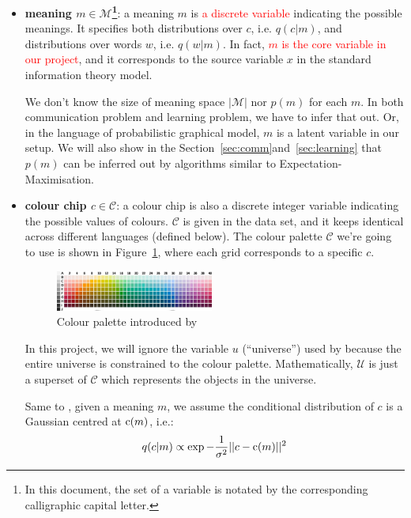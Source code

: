\documentclass[11pt]{article}
\begin{document}
\begin{itemize}[leftmargin=*]
    \item \textbf{meaning $m\in\mathcal{M}$\footnote{In this document, the set of a variable is notated by the corresponding calligraphic capital letter.}}: a meaning $m$ is \textcolor{red}{a discrete variable} indicating the possible meanings.
    It specifies both distributions over $c$, i.e. $q(c|m)$, and distributions over words $w$, i.e. $q(w|m)$.
    In fact, \textcolor{red}{$m$ is the core variable in our project}, and it corresponds to the source variable $x$ in the standard information theory model.
    
    We don't know the size of meaning space $|\mathcal{M}|$ nor $p(m)$ for each $m$.
    In both communication problem and learning problem, we have to infer that out.
    Or, in the language of probabilistic graphical model, $m$ is a latent variable in our setup.
    We will also show in the Section~\ref{sec:comm}and~\ref{sec:learning} that $p(m)$ can be inferred out by algorithms similar to Expectation-Maximisation. 

    \item \textbf{colour chip $c\in\mathcal{C}$}: a colour chip is also a discrete integer variable indicating the possible values of colours. 
    $\mathcal{C}$ is given in the data set, and it keeps identical across different languages (defined below). 
    The colour palette $\mathcal{C}$ we're going to use is shown in Figure~\ref{fig:colour_palette}, where each grid corresponds to a specific $c$.
        \begin{figure}[h]
            \centering
            \includegraphics[width=0.49\textwidth]{docs/intro_rate_distortion/graphs/colour_palette.jpg}
            \caption{Colour palette introduced by \citet{berlin1991basic}}
            \label{fig:colour_palette}
        \end{figure}
        
    In this project, we will ignore the variable $u$ (``universe'') used by \citet{zaslavsky2018efficient} because the entire universe is constrained to the colour palette. 
    Mathematically, $\mathcal{U}$ is just a superset of $\mathcal{C}$ which represents the objects in the universe.
    
    Same to \cite{zaslavsky2018efficient}, given a meaning $m$, we assume the conditional distribution of $c$ is a Gaussian centred at ${\textnormal{c}}(m)$, i.e.:
    \begin{align}
    q(c|m)\propto \exp{-\frac{1}{\sigma^2}}||c-{\textnormal{c}}(m)||^2    
    \end{align}
    

\end{itemize}
\end{document}
